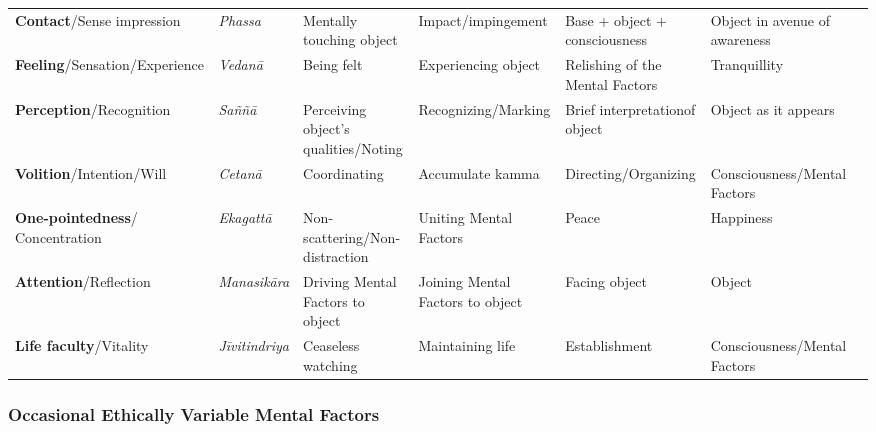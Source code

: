 \documentclass[a4 paper, 12pt]{article}
\begin{document}
\begin{tabular}{P{0.21\textwidth} | C{.13\textwidth} C{.165\textwidth} C{0.165\textwidth} C{0.165\textwidth} C{0.165\textwidth} m{0mm}}
\toprule
 &  &  &  &  & \\
\midrule
\textbf{Contact}/\newline Sense impression & \textit{Phassa} & Mentally touching object & Impact/\newline impingement & Base + object + consciousness & Object in avenue of awareness &\\[9mm]
\textbf{Feeling}/\newline Sensation/Experience & \textit{Vedanā} & Being felt & Experiencing object & Relishing of the Mental Factors & Tranquillity &\\[9mm]
\textbf{Perception}/\newline Recognition & \textit{Saññā} & Perceiving object’s qualities/\newline Noting & Recognizing/\newline Marking & Brief interpretation\newline of object & Object as it appears &\\[9mm]
\textbf{Volition}/\newline Intention/Will & \textit{Cetanā} & Coordinating & Accumulate kamma & Directing/\newline Organizing & Consciousness/\newline Mental Factors &\\[9mm]
\textbf{One-pointedness}/ Concentration & \textit{Ekagattā} & Non-scattering/\newline Non-distraction & Uniting Mental Factors & Peace & Happiness &\\[9mm]
\textbf{Attention}/\newline Reflection & \textit{Manasikāra} & Driving Mental Factors to object & Joining Mental Factors to object & Facing object & Object &\\[9mm]
\textbf{Life faculty}/\newline Vitality & \textit{Jīvitindriya} & Ceaseless watching & Maintaining life & Establishment & Consciousness/\newline Mental Factors &\\[9mm]
\bottomrule
\end{tabular} 

\subsubsection*{Occasional Ethically Variable Mental Factors}
\end{document}

